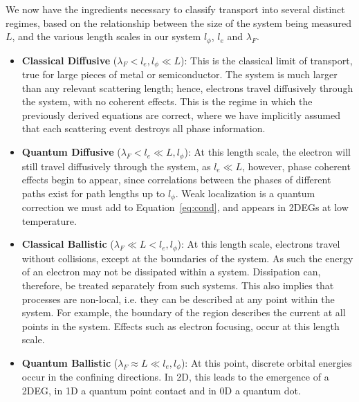 We now have the ingredients necessary to classify transport into several distinct regimes, based on the relationship between the size
of the system being measured $L$, and the various length scales in our system $l_\phi$, $l_e$ and $\lambda_F$.
\begin{itemize}
  \item \textbf{Classical Diffusive} ($\lambda_F < l_e, l_\phi \ll L$): This is the classical limit of transport, true for large pieces of metal or semiconductor. The system is much larger than any relevant scattering length; hence, electrons travel diffusively through the system, with no coherent effects. This is the regime in which the previously derived equations are correct, where we have implicitly assumed that each scattering event destroys all phase information.
  \item \textbf{Quantum Diffusive} ($\lambda_F < l_e \ll L, l_\phi$): At this length scale, the electron will still travel diffusively through the system, as $l_e \ll L$, however, phase coherent effects begin to appear, since correlations between the phases of different paths exist for path lengths up to $l_\phi$. Weak localization is a quantum correction we must add to Equation~\ref{eq:cond}, and appears in 2DEGs at low temperature.
  \item \textbf{Classical Ballistic} ($\lambda_F \ll L < l_e, l_\phi$): At this length scale, electrons travel without collisions, except at the boundaries of the system. As such the energy of an electron may not be dissipated within a system. Dissipation can, therefore, be treated separately from such systems. This also implies that processes are non-local, i.e. they can be described at any point within the system. For example, the boundary of the region describes the current at all points in the system. Effects such as electron focusing, occur at this length scale.
  \item \textbf{Quantum Ballistic} ($\lambda_F \approx L \ll l_e, l_\phi$): At this point, discrete orbital energies occur in the confining directions. In 2D, this leads to the emergence of a 2DEG, in 1D a quantum point contact and in 0D a quantum dot.
\end{itemize}

